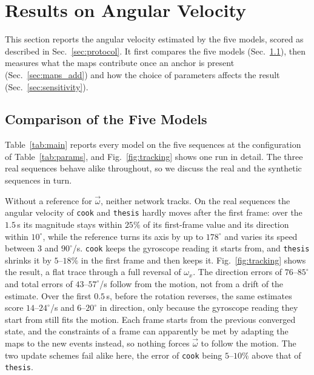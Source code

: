 \documentclass[journal]{IEEEtran}
\newcommand{\wvec}{\vec{\omega}}
\begin{document}
\section{Results on Angular Velocity}
\label{sec:experiments}

This section reports the angular velocity estimated by the five models, scored as described in Sec.~\ref{sec:protocol}. It first compares the five models (Sec.~\ref{sec:mainresults}), then measures what the maps contribute once an anchor is present (Sec.~\ref{sec:maps_add}) and how the choice of parameters affects the result (Sec.~\ref{sec:sensitivity}).

\subsection{Comparison of the Five Models}
\label{sec:mainresults}
\label{sec:beta_exp}
Table~\ref{tab:main} reports every model on the five sequences at the configuration of Table~\ref{tab:params}, and Fig.~\ref{fig:tracking} shows one run in detail. The three real sequences behave alike throughout, so we discuss the real and the synthetic sequences in turn.

Without a reference for $\wvec$, neither network tracks. On the real sequences the angular velocity of \texttt{cook} and \texttt{thesis} hardly moves after the first frame: over the $1.5$\,s its magnitude stays within $25\%$ of its first-frame value and its direction within $10^\circ$, while the reference turns its axis by up to $178^\circ$ and varies its speed between $3$ and $90^\circ$/s. \texttt{cook} keeps the gyroscope reading it starts from, and \texttt{thesis} shrinks it by $5$--$18\%$ in the first frame and then keeps it. Fig.~\ref{fig:tracking} shows the result, a flat trace through a full reversal of $\omega_x$. The direction errors of $76$--$85^\circ$ and total errors of $43$--$57^\circ$/s follow from the motion, not from a drift of the estimate. Over the first $0.5$\,s, before the rotation reverses, the same estimates score $14$--$24^\circ$/s and $6$--$20^\circ$ in direction, only because the gyroscope reading they start from still fits the motion. Each frame starts from the previous converged state, and the constraints of a frame can apparently be met by adapting the maps to the new events instead, so nothing forces $\wvec$ to follow the motion. The two update schemes fail alike here, the error of \texttt{cook} being $5$--$10\%$ above that of \texttt{thesis}.
\end{document}
